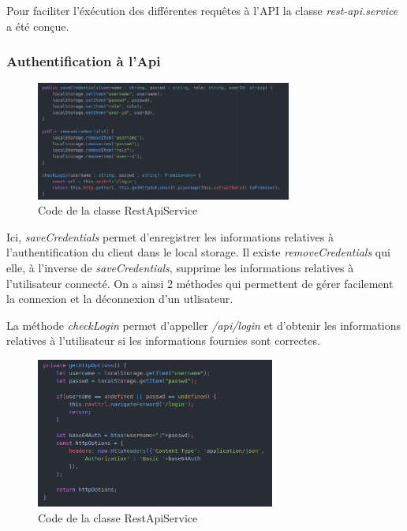 			Pour faciliter l'éxécution des différentes requêtes à l'API la classe \textit{rest-api.service} a été conçue.

			\subsubsection{Authentification à l'Api}

				\begin{figure}[H]
					\centering\includegraphics[width=0.75\textwidth, keepaspectratio]{res/ionic-rest-auth.png}
					\caption{Code de la classe RestApiService}
				\end{figure}

				\noindent
				Ici, \textit{saveCredentials} permet d'enregistrer les informations relatives à l'authentification du client dans le local storage. Il existe \textit{removeCredentials} qui elle, à l'inverse de \textit{saveCredentials}, supprime les informations relatives à l'utilisateur connecté. On a ainsi 2 méthodes qui permettent de gérer facilement la connexion et la déconnexion d'un utlisateur.

				\noindent
				La méthode \textit{checkLogin} permet d'appeller \textit{/api/login} et d'obtenir les informations relatives à l'utilisateur si les informations fournies sont correctes.

				\begin{figure}[H]
					\centering\includegraphics[width=0.70\textwidth, keepaspectratio]{res/ionic-rest-httpoptions.png}
					\caption{Code de la classe RestApiService}
				\end{figure}

